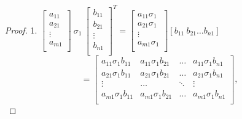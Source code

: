 \documentclass[12pt,a4paper]{report}
\begin{document}
\begin{proof}
1.
$\left[ \begin{array}{c}
         a_{11} \\
         a_{21} \\
         \vdots \\
         a_{m1} \\
         \end{array}
      \right] \: \sigma_{1} \: \left[ \begin{array}{c}
         b_{11} \\
         b_{21} \\
         \vdots \\
         b_{n1} \\
         \end{array}
      \right]^T = \left[
        \begin{array}{c}
         a_{11} \sigma_{1} \\
         a_{21} \sigma_{1} \\
         \vdots \\
         a_{m1} \sigma_{1} \\
         \end{array}
      \right] [b_{11} \: b_{21} \ldots b_{n1}]$
      $$ =  \left[
        \begin{array}{cccc}
         a_{11} \sigma_{1} b_{11}  & a_{11} \sigma_{1} b_{21} & \ldots & a_{11} \sigma_{1} b_{n1}  \\
         a_{21} \sigma_{1} b_{11} & a_{21} \sigma_{1} b_{21} & \ldots & a_{21} \sigma_{1} b_{n1} \\
         \vdots & \ldots & \ddots & \vdots \\
         a_{m1} \sigma_{1} b_{11} & a_{m1} \sigma_{1} b_{21} & \ldots & a_{m1} \sigma_{1} b_{n1} \\
         \end{array}
      \right], $$


\end{proof}
\end{document}
